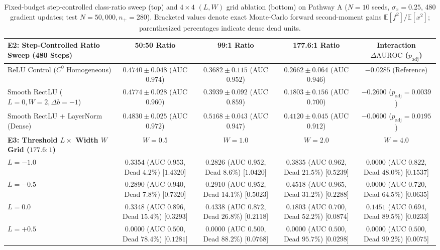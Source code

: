 \documentclass[10pt,a4paper]{article}
\begin{document}
\begin{table}[t]
\centering
\caption{Fixed-budget step-controlled class-ratio sweep (top) and $4 \times 4$ $(L, W)$ grid ablation (bottom) on Pathway A ($N=10$ seeds, $\sigma_x=0.25$, 480 gradient updates; test $N=50,000, n_+=280$). Bracketed values denote exact Monte-Carlo forward second-moment gains $\mathbb{E}[f^2]/\mathbb{E}[x^2]$; parenthesized percentages indicate dense dead units.}
\label{tab:lw_grid}
\footnotesize
\setlength{\tabcolsep}{4.2pt}
\renewcommand{\arraystretch}{1.05}
\begin{tabular}{lcccc}
\toprule
\textbf{E2: Step-Controlled Ratio Sweep (480 Steps)} & \textbf{50:50 Ratio} & \textbf{99:1 Ratio} & \textbf{177.6:1 Ratio} & \textbf{Interaction $\Delta\text{AUROC}$ ($p_{\text{adj}}$)} \\
\midrule
ReLU Control ($C^0$ Homogeneous) & $0.4740 \pm 0.048$ (AUC $0.974$) & $0.3682 \pm 0.115$ (AUC $0.952$) & $0.2662 \pm 0.064$ (AUC $0.946$) & $-0.0285$ (Reference) \\
Smooth RectLU ($L=0, W=2, \Delta b=-1$) & $0.4774 \pm 0.028$ (AUC $0.960$) & $0.3939 \pm 0.092$ (AUC $0.859$) & $0.1803 \pm 0.156$ (AUC $0.700$) & $-0.2600$ ($p_{\text{adj}} = 0.0039$) \\
Smooth RectLU + LayerNorm (Dense) & $0.4830 \pm 0.025$ (AUC $0.972$) & $0.5168 \pm 0.043$ (AUC $0.947$) & $0.4120 \pm 0.045$ (AUC $0.912$) & $-0.0600$ ($p_{\text{adj}} = 0.0195$) \\
\midrule
\textbf{E3: Threshold $L \times$ Width $W$ Grid ($177.6:1$)} & $W = 0.5$ & $W = 1.0$ & $W = 2.0$ & $W = 4.0$ \\
\midrule
$L = -1.0$ & $0.3354$ (AUC $0.953$, Dead $4.2\%$) [$1.4320$] & $0.2826$ (AUC $0.952$, Dead $8.6\%$) [$1.0420$] & $0.3835$ (AUC $0.962$, Dead $21.5\%$) [$0.5239$] & $0.0000$ (AUC $0.822$, Dead $48.0\%$) [$0.1537$] \\
$L = -0.5$ & $0.2890$ (AUC $0.940$, Dead $7.8\%$) [$0.7320$] & $0.2910$ (AUC $0.952$, Dead $14.1\%$) [$0.5023$] & $0.4518$ (AUC $0.965$, Dead $31.2\%$) [$0.2288$] & $0.0000$ (AUC $0.720$, Dead $64.5\%$) [$0.0635$] \\
$L = 0.0$ & $0.3348$ (AUC $0.896$, Dead $15.4\%$) [$0.3293$] & $0.4338$ (AUC $0.872$, Dead $26.8\%$) [$0.2118$] & $0.1803$ (AUC $0.700$, Dead $52.2\%$) [$0.0874$] & $0.1451$ (AUC $0.694$, Dead $89.5\%$) [$0.0233$] \\
$L = +0.5$ & $0.0000$ (AUC $0.500$, Dead $78.4\%$) [$0.1281$] & $0.0000$ (AUC $0.500$, Dead $88.2\%$) [$0.0768$] & $0.0000$ (AUC $0.500$, Dead $95.7\%$) [$0.0298$] & $0.0000$ (AUC $0.500$, Dead $99.2\%$) [$0.0075$] \\
\bottomrule
\end{tabular}
\end{table}
\end{document}
